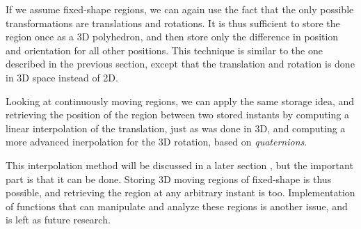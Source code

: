 If we assume fixed-shape regions, we can again use the fact that the only possible transformations are translations and rotations. It is thus sufficient to store the region once as a 3D polyhedron, and then store only the difference in position and orientation for all other positions. This technique is similar to the one described in the previous section, except that the translation and rotation is done in 3D space instead of 2D.

Looking at continuously moving regions, we can apply the same storage idea, and retrieving the position of the region between two stored instants by computing a linear interpolation of the translation, just as was done in 3D, and computing a more advanced inerpolation for the 3D rotation, based on \textit{quaternions}.

This interpolation method will be discussed in a later section , but the important part is that it can be done. Storing 3D moving regions of fixed-shape is thus possible, and retrieving the region at any arbitrary instant is too. Implementation of functions that can manipulate and analyze these regions is another issue, and is left as future research.
